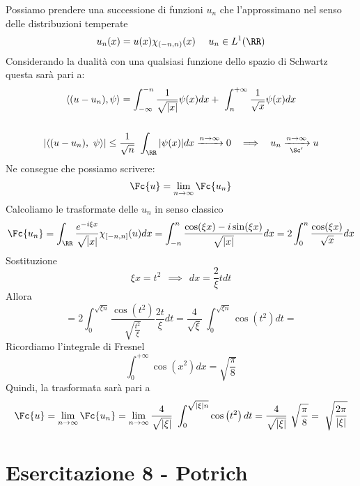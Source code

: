 Possiamo prendere una successione di funzioni $u_{n}$ che l'approssimano nel senso delle distribuzioni temperate
\begin{equation*}
u_{n}(x) = u(x) \chi_{(- n, n)}(x) \ \ \ \ u_{n} \in L^{1} (\RR)
\end{equation*}
Considerando la dualità con una qualsiasi funzione dello spazio di Schwartz questa sarà pari a:
\begin{gather*}
\langle (u - u_{n}), \psi \rangle = \int^{- n}_{- \infty}\frac{1}{\sqrt{| x|}} \psi (x) dx + \ \int^{+ \infty}_{n}\frac{1}{\sqrt{x}} \psi (x) dx\\
\\
| \langle (u - u_{n}), \ \psi \rangle | \leq \frac{1}{\sqrt{n}} \ \int_{\RR}| \psi (x)| dx\xrightarrow{n\rightarrow \infty} 0\ \ \implies \ \ u_{n}\xrightarrow[\Sc']{n\rightarrow \infty} u
\end{gather*}
Ne consegue che possiamo scrivere:
\begin{equation*}
\Fc \{u\} = \lim_{n\rightarrow \infty}\Fc \{u_{n}\}
\end{equation*}
Calcoliamo le trasformate delle $u_{n}$ in senso classico
\begin{equation*}
\Fc \{u_{n}\} = \int_{\RR}\frac{e^{- i\xi x}}{\sqrt{|} x|} \chi_{[ - n, n]} (u)dx = \int^{n}_{- n}\frac{\cos(\xi x) - i\sin (\xi x)}{\sqrt{| x|}} dx = 2\int^{n}_{0}\frac{\cos(\xi x)}{\sqrt{x}} dx
\end{equation*}
Sostituzione
\begin{equation*}
\xi x = t^{2} \ \ \implies \ \ dx = \frac{2}{\xi} tdt
\end{equation*}
Allora
\begin{equation*}
= 2\int^{\sqrt{\xi n}}_{0}\frac{\cos\left(t^{2}\right)}{\sqrt{\frac{t^{2}}{\xi}}}\frac{2t}{\xi} dt = \frac{4}{\sqrt{\xi}} \ \int^{\sqrt{\xi n}}_{0}\cos\left(t^{2}\right) dt =
\end{equation*}
Ricordiamo l'integrale di Fresnel
\begin{equation*}
\int^{+ \infty}_{0}\cos\left(x^{2}\right) dx = \sqrt{\frac{\pi}{8}}
\end{equation*}
Quindi, la trasformata sarà pari a
\begin{equation*}
\Fc \{u\} = \lim_{n\rightarrow \infty}\Fc \{u_{n}\} = \lim_{n\rightarrow \infty}\frac{4}{\sqrt{| \xi |}} \ \int^{\sqrt{| \xi | n}}_{0}\cos\left(t^{2}\right) dt = \frac{4}{\sqrt{| \xi |}} \ \sqrt{\frac{\pi}{8}} = \ \sqrt{\frac{2\pi}{| \xi |}}
\end{equation*}
\chapter{Esercitazione 8 - Potrich}

